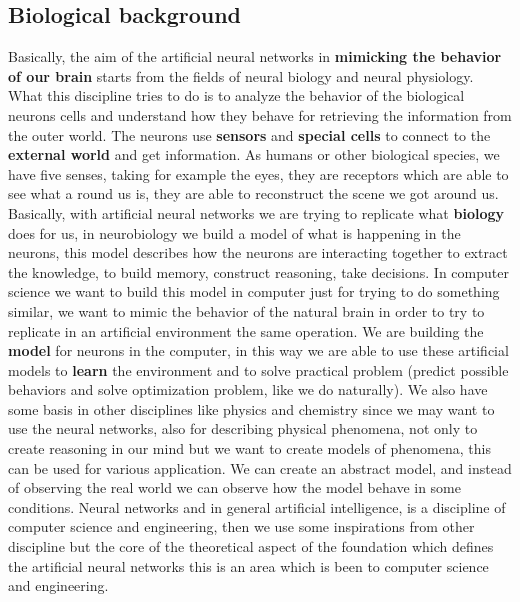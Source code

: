 \documentclass{article}
\begin{document}
\subsection{Biological background}
Basically, the aim of the artificial neural networks in \textbf{mimicking the behavior of our brain} starts
from the fields of neural biology and neural physiology. What this discipline tries to do is to analyze the
behavior of the biological neurons cells and understand how they behave for retrieving
the information from the outer world.
\newline\newline
The neurons use \textbf{sensors} and \textbf{special cells} to connect to the \textbf{external world} and get
information.
As humans or other biological species, we have five senses, taking for example the eyes, they are receptors
which are able to see what a round us is, they are able to reconstruct the scene we got around us.
\newline\newline
Basically, with artificial neural networks we are trying to replicate what \textbf{biology} does for us, in neurobiology
we build a model of what is happening in the neurons, this model describes how the neurons are
interacting together to extract the knowledge, to build memory, construct reasoning, take decisions.
\newline\newline
In computer science we want to build this model in computer just for trying to do something similar, we want to mimic the
behavior of the natural brain in order to try to replicate in an artificial environment the same operation.
\newline\newline
We are building the \textbf{model} for neurons in the computer, in this way we are able to use these
artificial models to \textbf{learn} the environment and to solve practical problem (predict possible behaviors
and solve optimization problem, like we do naturally). We also have some basis in other disciplines like
physics and chemistry since we may want to use the neural networks, also for describing physical phenomena,
not only to create reasoning in our mind but we want to create models of phenomena, this can be used for various application.
We can create an abstract model, and instead of observing the real world we can observe how the model behave in some conditions.
\newline\newline
Neural networks and in general artificial intelligence, is a discipline of computer science and
engineering, then we use some inspirations from other discipline but the core of the theoretical aspect
of the foundation which defines the artificial neural networks this is an area which is been to computer science and engineering.
\end{document}

